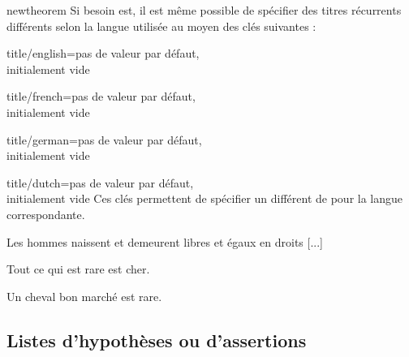 \begin{docCommand}{newtheorem}{}
  Si besoin est, il est même possible de spécifier des titres récurrents
  différents selon la langue utilisée au moyen des clés suivantes :
  \begin{docKey}{title/english}{={}}{pas de
      valeur par défaut,\\initialement vide}
  \end{docKey}
  \begin{docKey}{title/french}{={}}{pas de
      valeur par défaut,\\initialement vide}
  \end{docKey}
  \begin{docKey}{title/german}{={}}{pas de
      valeur par défaut,\\initialement vide}
  \end{docKey}
  \begin{docKey}{title/dutch}{={}}{pas de
      valeur par défaut,\\initialement vide}
    Ces clés permettent de spécifier un  différent
    de  pour la langue correspondante.
  \end{docKey}

\begin{bodycode}
\begin{article}
Les hommes naissent et demeurent libres et égaux en droits [...]
\end{article}
\begin{fact*}
Tout ce qui est rare est cher.
\end{fact*}
\begin{fact}
Un cheval bon marché est rare.
\end{fact}
\end{bodycode}
\end{docCommand}

\subsection{Listes d'hypothèses ou d'assertions}
\label{sec:list-dhyp-ou}

